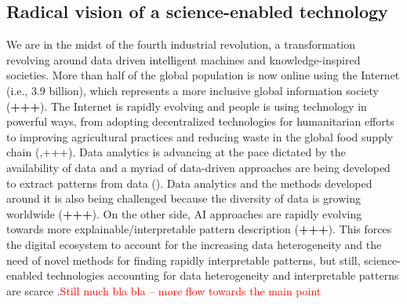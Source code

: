 \documentclass[11pt, a4paper]{article} %
\begin{document}
\subsection{Radical vision of a science-enabled technology}
We are in the midst of the fourth industrial revolution, a
transformation revolving around data driven intelligent machines and
knowledge-inspired societies. More than half of the global population
is now online using the Internet (i.e., 3.9 billion), which represents
a more inclusive global information society ({\bf +++}). The Internet
is rapidly evolving and people is using technology in powerful ways,
from adopting decentralized technologies for humanitarian efforts to
improving agricultural practices and reducing waste in the global food
supply chain (\citep{Wilson2018},+++). Data analytics is advancing at
the pace dictated by the availability of data and a myriad of
data-driven approaches are being developed to extract patterns from
data (\citep{Schmidhuber:2015}). Data analytics and the methods
developed around it is also being challenged because the diversity of
data is growing worldwide ({\bf +++}). On the other side, AI
approaches are rapidly evolving towards more explainable/interpretable
pattern description ({\bf +++}). This forces the digital ecosystem to
account for the increasing data heterogeneity and the need of novel
methods for finding rapidly interpretable patterns, but still,
science-enabled technologies accounting for data heterogeneity and
interpretable patterns are scarce \citep{RePEc}.\textcolor{red}{Still
  much bla bla -- more flow towards the main point}
  
\end{document}
